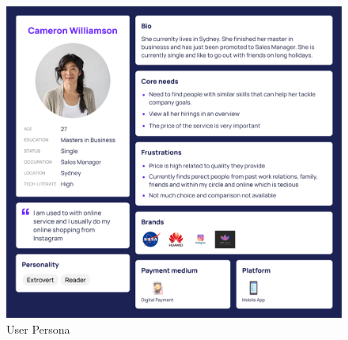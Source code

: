 \begin{figure}[H]
	\centering
	\includegraphics[width=\textwidth]{contents/chapter-3/images/up-dummy.png}
	\caption[Caption]{User Persona}
	\label{Fig:UserPersona}
\end{figure}
